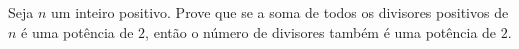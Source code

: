 Seja $n$ um inteiro positivo. Prove que se a soma de todos os divisores positivos de $n$ é uma potência de $2$, então o número de divisores também é uma potência de $2$.
